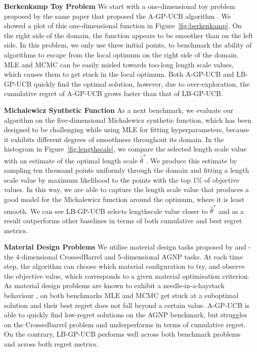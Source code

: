\documentclass{article}
\theoremstyle{plain}
\theoremstyle{definition}
\theoremstyle{remark}
\theoremstyle{plain}
\begin{document}
\textbf{Berkenkamp Toy Problem} We start with a one-dimensional toy problem proposed by the same paper that proposed the A-GP-UCB algorithm \cite{berkenkamp2019no}. We showed a plot of this one-dimensional function in Figure~\ref{fig:berkenkamp}. On the right side of the domain, the function appears to be smoother than on the left side. In this problem, we only use three initial points, to benchmark the ability of algorithms to escape from the local optimum on the right side of the domain. MLE and MCMC can be easily misled towards too-long length scale values, which causes them to get stuck in the local optimum.  Both A-GP-UCB and LB-GP-UCB quickly find the optimal solution, however, due to over-exploration, the cumulative regret of A-GP-UCB grows faster than that of LB-GP-UCB.


\textbf{Michalewicz Synthetic Function} As a next benchmark, we evaluate our algorithm on the five-dimensional Michalewicz synthetic function, which has been designed to be challenging while using MLE for fitting hyperparameters, because it exhibits different degrees of smoothness throughout its domain. In the histogram in Figure~\ref{fig:lengthscale}, we compare the selected length scale value with an estimate of the optimal length scale $\hat{\theta}^*$. We produce this estimate by sampling ten thousand points uniformly through the domain and fitting a length scale value by maximum likelihood to the points with the top 1\% of objective values. In this way, we are able to capture the length scale value that produces a good model for the Michalewicz function around the optimum, where it is least smooth. We can see LB-GP-UCB selects lengthscale value closer to $\hat{\theta}^*$ and as a result outperforms other baselines in terms of both cumulative and best regret metrics. 


\textbf{Material Design Problems} We utilise material design tasks proposed by \cite{gongora2020bayesian} and \cite{mekki2021two} - the 4-dimensional CrossedBarrel  and 5-dimensional AGNP   tasks. At each time step, the algorithm can choose which material configuration to try, and observe the objective value, which corresponds to a given material optimisation criterion.  As material design problems are known to exhibit a needle-in-a-haystack behaviour \cite{siemenn2023fast}, on both benchmarks MLE and MCMC get stuck at a suboptimal solution and their best regret does not fall beyond a certain value. A-GP-UCB is able to quickly find low-regret solutions on the AGNP benchmark, but struggles on the Crossedbarrel problem and underperforms in terms of cumulative regret. On the contrary, LB-GP-UCB performs well across both benchmark problems and across both regret metrics. 
\end{document}
